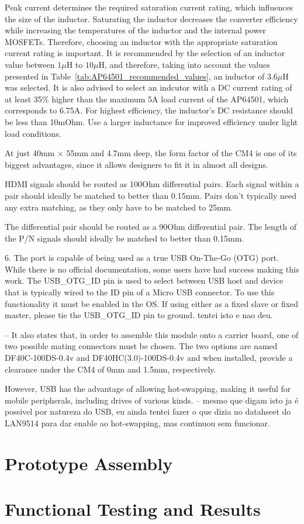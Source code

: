     Peak current determines the required saturation current rating, which influences the size of the inductor. Saturating the inductor decreases the converter efficiency while increasing the temperatures of the inductor and the internal power MOSFETs. Therefore, choosing an inductor with the appropriate saturation current rating is important. 
    It is recommended by \cite{AP64501} the selection of an inductor value between $1 \mu$H to $10 \mu$H, and therefore, taking into account the values presented in Table~\ref{tab:AP64501_recommended_values}, an inductor of $3.6 \mu$H was selected. It is also advised to select an indcutor with a DC current rating of at least 35\% higher than the maximum 5A load current of the AP64501, which corresponds to 6.75A.
    For highest efficiency, the inductor's DC resistance should be less than 10mOhm. Use a larger inductance for improved efficiency under light load conditions.


    At just 40mm $\times$ 55mm and 4.7mm deep, the form factor of the CM4 is one of its biggest advantages, since it allows designers to fit it in almost all designs.

    HDMI signals should be routed as 100Ohm differential pairs. Each signal within a pair should ideally be matched to better than 0.15mm. Pairs don't typically need any extra matching, as they only have to be matched to 25mm.

    The differential pair should be routed as a 90Ohm differential pair. The length of the P/N signals should ideally be matched to better than 0.15mm.

    6. The port is capable of being used as a true USB On-The-Go (OTG) port. While there is no official documentation, some users have had success making this work. The USB\_OTG\_ID pin is used to select between USB host and device that is typically wired to the ID pin of a Micro USB connector. To use this functionality it must be enabled in the OS. If using either as a fixed slave or fixed master, please tie the USB\_OTG\_ID pin to ground. tentei isto e nao deu.

	-- It also states that, in order to assemble this module onto a carrier board, one of two possible mating connectors must be chosen. The two options are named DF40C-100DS-0.4v and DF40HC(3.0)-100DS-0.4v and when installed, provide a clearance under the CM4 of 0mm and 1.5mm, respectively. 

    However, USB has the advantage of allowing hot-swapping, making it useful for mobile peripherals, including drives of various kinds. -- mesmo que digam isto ja é possivel por natureza do USB, eu ainda tentei fazer o que dizia no datahseet do LAN9514 para dar enable ao hot-swapping, mas continuou sem funcionar.

\section{Prototype Assembly}\label{sec:53_PrototypeAssembly}

\section{Functional Testing and Results}\label{sec:54_FunctionalTesting}